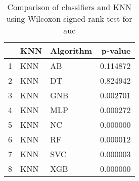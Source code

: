 \begin{table}
\footnotesize
\caption{Comparison of classifiers and KNN using Wilcoxon signed-rank test for auc}
\label{tab:KNN wilcoxon AUC comparison}
\begin{tabular}{lllr}
\hline
 & KNN & Algorithm & p-value \\
\hline
1 & KNN & AB & 0.114872 \\
2 & KNN & DT & 0.824942 \\
3 & KNN & GNB & 0.002701 \\
4 & KNN & MLP & 0.000272 \\
5 & KNN & NC & 0.000000 \\
6 & KNN & RF & 0.000012 \\
7 & KNN & SVC & 0.000003 \\
8 & KNN & XGB & 0.000000 \\
\hline
\end{tabular}
\end{table}
